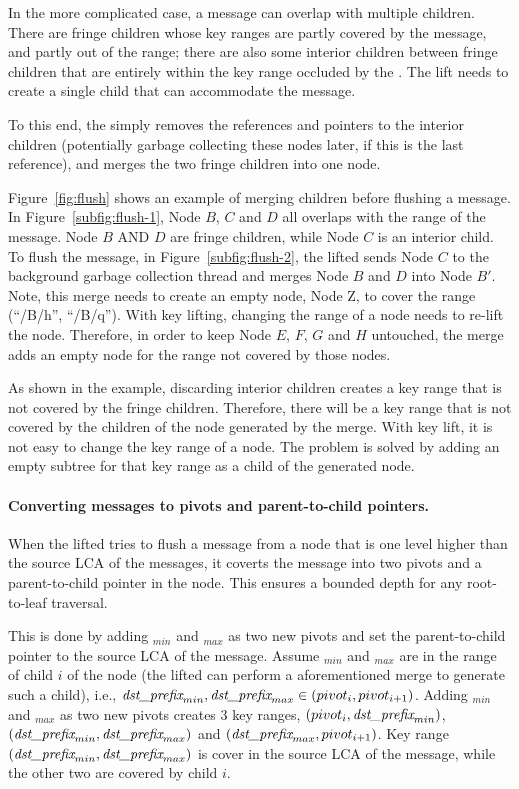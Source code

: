 In the more complicated case, a \goto message can overlap with multiple
children.
There are fringe children whose key ranges are partly covered by the \goto
message, and partly out of the \goto range;
there are also some interior children between fringe children that are entirely
within the key range occluded by the \goto.
The lift \bedag needs to create a single child that can accommodate the \goto
message.

To this end, the \bedag simply removes the references and pointers to the
interior children (potentially garbage collecting these nodes later, if this is
the last reference),
and merges the two fringe children into one node.

Figure~\ref{fig:flush} shows an example of merging children before flushing a
\goto message.
In Figure~\ref{subfig:flush-1}, Node $B$, $C$ and $D$ all overlaps with the
range of the \goto message.
Node $B$ AND $D$ are fringe children, while Node $C$ is an interior child.
To flush the \goto message, in Figure~\ref{subfig:flush-2}, the lifted \bedag
sends Node $C$ to the background garbage collection thread and merges Node $B$
and $D$ into Node $B'$.
Note, this merge needs to create an empty node, Node Z, to cover the range
(``/B/h'', ``/B/q'').
With key lifting, changing the range of a node needs to re-lift the node.
Therefore, in order to keep Node $E$, $F$, $G$ and $H$ untouched, the merge
adds an empty node for the range not covered by those nodes.

As shown in the example, discarding interior children creates a key range that
is not covered by the fringe children.
Therefore, there will be a key range that is not covered by the children of the
node generated by the merge.
With key lift, it is not easy to change the key range of a node.
The problem is solved by adding an empty subtree for that key range as a child
of the generated node.

\paragraph{Converting \goto messages to pivots and parent-to-child pointers.}
When the lifted \bedag tries to flush a \goto message from a node that is one
level higher than the source LCA of the \goto messages, it coverts the \goto
message into two pivots and a parent-to-child pointer in the node.
This ensures a bounded depth for any root-to-leaf traversal.

This is done by adding \dpre$_{min}$ and \dpre$_{max}$ as two new pivots and
set the parent-to-child pointer to the source LCA of the \goto message.
Assume \dpre$_{min}$ and \dpre$_{max}$ are in the range of child $i$ of the node
(the lifted \bedag can perform a aforementioned merge to generate such a child),
i.e., $\textit{dst\_prefix}_{min}, \textit{dst\_prefix}_{max} \in (pivot_{i},pivot_{i+1})$.
Adding \dpre$_{min}$ and \dpre$_{max}$ as two new pivots creates 3 key ranges,
$(pivot_{i},\textit{dst\_prefix}_{min})$, $(\textit{dst\_prefix}_{min},\textit{dst\_prefix}_{max})$ and
$(\textit{dst\_prefix}_{max}, pivot_{i+1})$.
Key range $(\textit{dst\_prefix}_{min},\textit{dst\_prefix}_{max})$ is cover in the source LCA of the \goto
message, while the other two are covered by child $i$.


